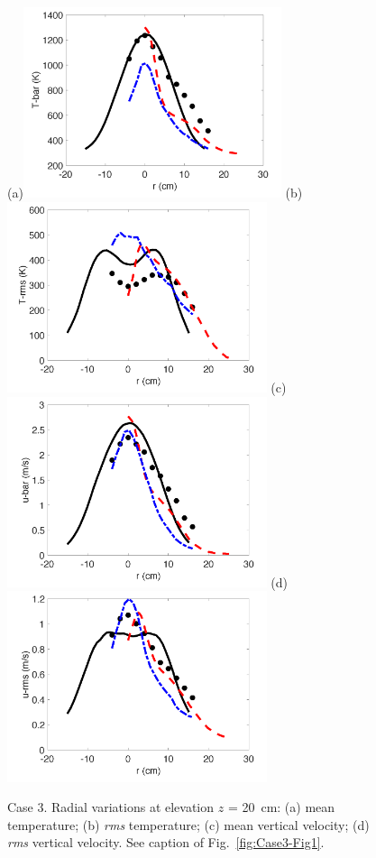 \begin{figure}
\centering
(a)\includegraphics[height=2.2in]{Figures/Case3-Fig2a.png}
(b)\includegraphics[height=2.2in]{Figures/Case3-Fig2b.png}
(c)\includegraphics[height=2.2in]{Figures/Case3-Fig2c.png}
(d)\includegraphics[height=2.2in]{Figures/Case3-Fig2d.png}
\caption{Case 3. Radial variations at elevation $z$ = 20~cm: (a) mean temperature; (b) {\it rms} temperature; (c) mean vertical velocity; (d) {\it rms} vertical velocity. See caption of Fig.~\ref{fig:Case3-Fig1}.}
\label{fig:Case3-Fig2}
\end{figure}

